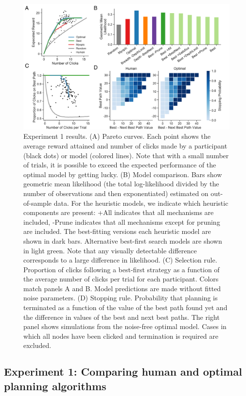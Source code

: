 \begin{figure}[t!]
  \centering
  \includegraphics[width=\textwidth]{figs/planning/fig3.pdf}
  \caption{Experiment 1 results.
    (A) Pareto curves. Each point shows the average reward attained and number of clicks made by a participant (black dots) or model (colored lines). Note that with a small number of trials, it is possible to exceed the expected performance of the optimal model by getting lucky.
    (B) Model comparison. Bars show geometric mean likelihood (the total log-likelihood divided by the number of observations and then exponentiated) estimated on out-of-sample data. For the heuristic models, we indicate which heuristic components are present: +All indicates that all mechanisms are included, -Prune indicates that all mechanisms except for pruning are included. The best-fitting versions each heuristic model are shown in dark bars. Alternative best-first search models are shown in light green. Note that any visually detectable difference corresponds to a large difference in likelihood.
    (C) Selection rule. Proportion of clicks following a best-first strategy as a function of the average number of clicks per trial for each participant. Colors match panels A and B. Model predictions are made without fitted noise parameters.
    (D) Stopping rule. Probability that planning is terminated as a function of the value of the best path found yet and the difference in values of the best and next best paths. The right panel shows simulations from the noise-free optimal model. Cases in which all nodes have been clicked and termination is required are excluded.
  }
  \label{fig:planning-exp1}
\end{figure}


\subsection{Experiment 1: Comparing human and optimal planning algorithms}\label{sec:planning-results1}

